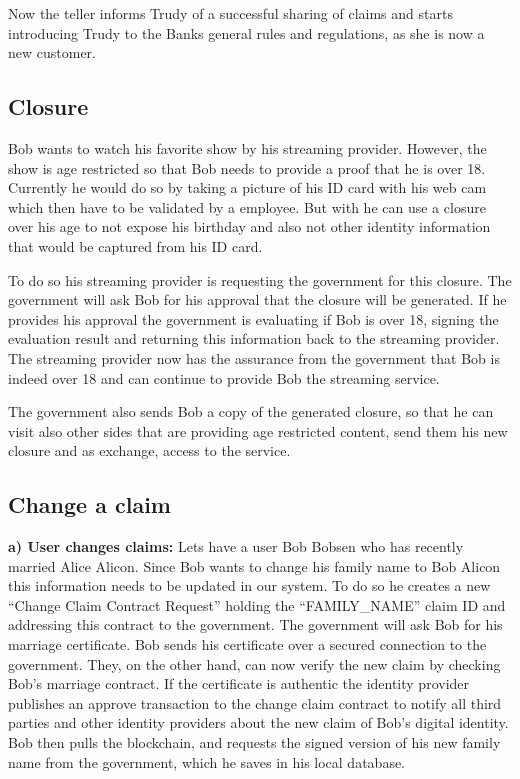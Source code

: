 Now the teller informs Trudy of a successful sharing of claims and starts introducing Trudy to the Banks general rules and regulations, as she is now a new customer.

\subsection{Closure}
\label{sec:closureUserCase}

Bob wants to watch his favorite show by his streaming provider. However, the show is age restricted so that Bob needs to provide a proof that he is over 18. Currently he would do so by taking a picture of his ID card with his web cam which then have to be validated by a employee. But with \projectName{} he can use a closure over his age to not expose his birthday and also not other identity information that would be captured from his ID card. 

To do so his streaming provider is requesting the government for this closure. The government will ask Bob for his approval that the closure will be generated. If he provides his approval the government is evaluating if Bob is over 18, signing the evaluation result and returning this information back to the streaming provider. The streaming provider now has the assurance from the government that Bob is indeed over 18 and can continue to provide Bob the streaming service. 

The government also sends Bob a copy of the generated closure, so that he can visit also other sides that are providing age restricted content, send them his new closure and as exchange, access to the service. 

\subsection{Change a claim}
\label{sec:changeClaimUseCase}
\textbf{a) User changes claims:}
Lets have a user Bob Bobsen who has recently married Alice Alicon. Since Bob wants to change his family name to Bob Alicon this information needs to be updated in our system. To do so he creates a new “Change Claim Contract Request” holding the “FAMILY\_NAME” claim ID and addressing this contract to the government. The government will ask Bob for his marriage certificate. Bob sends his certificate over a secured connection to the government. They, on the other hand, can now verify the new claim by checking Bob's marriage contract. If the certificate is authentic the identity provider publishes an approve transaction to the change claim contract to notify all third parties and other identity providers about the new claim of Bob's digital identity.
Bob then pulls the blockchain, and requests the signed version of his new family name from the government, which he saves in his local database.

